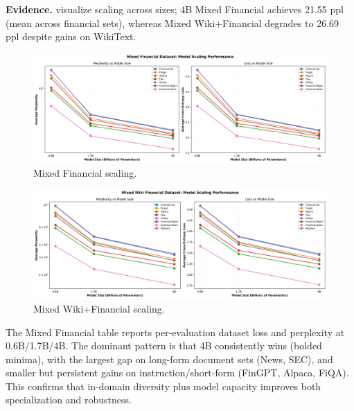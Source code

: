 \textbf{Evidence.}  visualize scaling across sizes; 4B Mixed Financial achieves 21.55 ppl (mean across financial sets), whereas Mixed Wiki+Financial degrades to 26.69 ppl despite gains on WikiText.

\begin{figure}[H]
  \centering
  \includegraphics[width=\textwidth]{../thesis/figures/scaling_mixed_financial.png}
  \caption{Mixed Financial scaling.}\label{fig:scaling_mixed_financial}
\end{figure}

\begin{figure}[H]
  \centering
  \includegraphics[width=\textwidth]{../thesis/figures/scaling_mixed_wiki_financial.png}
  \caption{Mixed Wiki+Financial scaling.}\label{fig:scaling_mixed_wiki_financial}
\end{figure}



The Mixed Financial table reports per-evaluation dataset loss and perplexity at 0.6B/1.7B/4B. The dominant pattern is that 4B consistently wins (bolded minima), with the largest gap on long-form document sets (News, SEC), and smaller but persistent gains on instruction/short-form (FinGPT, Alpaca, FiQA). This confirms that in-domain diversity plus model capacity improves both specialization and robustness.



